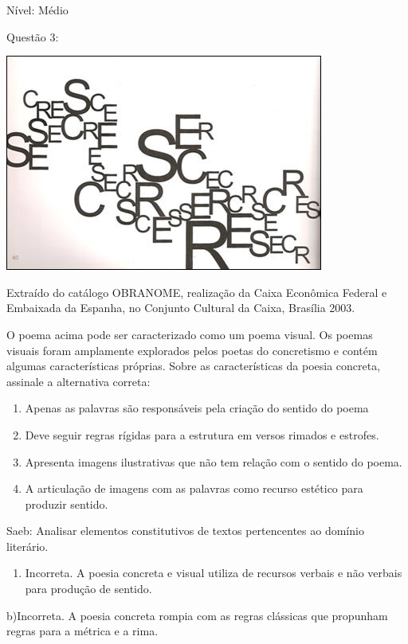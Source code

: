 Nível: Médio

Questão 3:

\includegraphics[width=4.11458in,height=2.80208in]{./imgSAEB_7_POR/media/image3.png}

Extraído do catálogo OBRANOME, realização da Caixa Econômica Federal e
Embaixada da Espanha, no Conjunto Cultural da Caixa, Brasília 2003.

O poema acima pode ser caracterizado como um poema visual. Os poemas
visuais foram amplamente explorados pelos poetas do concretismo e contém
algumas características próprias. Sobre as características da poesia
concreta, assinale a alternativa correta:

\begin{enumerate}
\def\labelenumi{\arabic{enumi}.}
\item
  Apenas as palavras são responsáveis pela criação do sentido do poema
\item
  Deve seguir regras rígidas para a estrutura em versos rimados e
  estrofes.
\item
  Apresenta imagens ilustrativas que não tem relação com o sentido do
  poema.
\item
  A articulação de imagens com as palavras como recurso estético para
  produzir sentido.
\end{enumerate}

Saeb: Analisar elementos constitutivos de textos pertencentes ao domínio
literário.

\begin{enumerate}
\def\labelenumi{\arabic{enumi}.}
\tightlist
\item
  Incorreta. A poesia concreta e visual utiliza de recursos verbais e
  não verbais para produção de sentido.
\end{enumerate}

b)Incorreta. A poesia concreta rompia com as regras clássicas que
propunham regras para a métrica e a rima.

